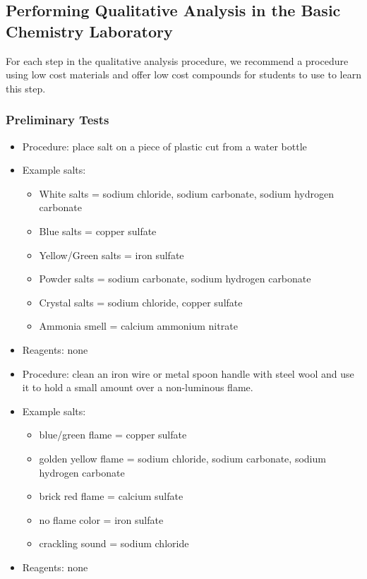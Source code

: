 \subsection{Performing Qualitative Analysis in the Basic Chemistry Laboratory}

For each step in the qualitative analysis procedure, 
we recommend a procedure using low cost materials 
and offer low cost compounds for students to use to learn this step.

\subsubsection{Preliminary Tests}

\begin{itemize}
\item{Procedure: place salt on a piece of plastic cut from a water bottle}
\item{Example salts:}
\begin{itemize}
\item{White salts = sodium chloride, 
sodium carbonate, 
sodium hydrogen carbonate}
\item{Blue salts = copper sulfate}
\item{Yellow/Green salts = iron sulfate}
\item{Powder salts = sodium carbonate, 
sodium hydrogen carbonate}
\item{Crystal salts = sodium chloride, 
copper sulfate}
\item{Ammonia smell = calcium ammonium nitrate}
\end{itemize}
\item{Reagents: none}
\end{itemize}

\begin{itemize}
\item{Procedure: clean an iron wire or metal spoon handle 
with steel wool and use it to hold a small amount 
over a non-luminous flame.}
\item{Example salts:}
\begin{itemize}
\item{blue/green flame = copper sulfate}
\item{golden yellow flame = sodium chloride, 
sodium carbonate, 
sodium hydrogen carbonate}
\item{brick red flame = calcium sulfate}
\item{no flame color = iron sulfate}
\item{crackling sound = sodium chloride}
\end{itemize}
\item{Reagents: none}
\end{itemize}

